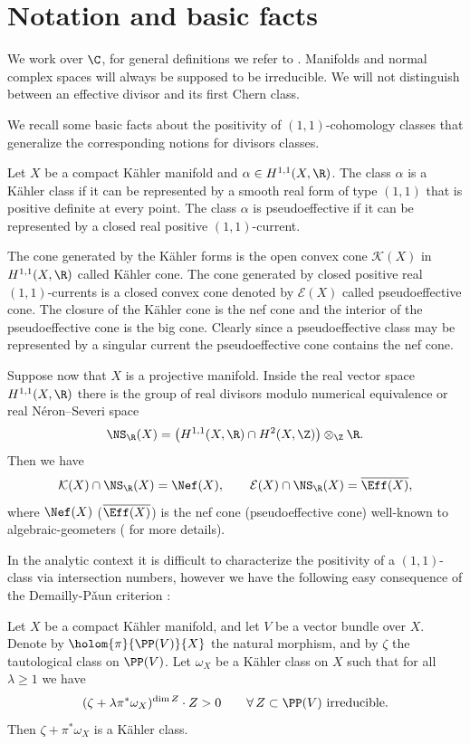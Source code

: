 \section{Notation and basic facts}

We work over $\C$, for general definitions we refer to \cite{Har77, Dem12}.
Manifolds and normal complex spaces will always be supposed to be irreducible.
We will not distinguish between an effective divisor and its first Chern class.

We recall some basic facts about the positivity of $(1,1)$-cohomology classes that generalize
the corresponding notions for divisors classes.

\begin{definition}
Let $X$ be a compact Kähler manifold and $\alpha\in H^{1,1}(X, \R)$. The class $\alpha$ is a Kähler class if it can be represented by a smooth real form of type $(1,1)$ that is positive definite at every point. The class $\alpha$ is pseudoeffective if it can be represented by a closed real positive $(1,1)$-current.
\end{definition}

The cone generated by the Kähler forms is the open convex cone $\mathcal{K}(X)$ in $H^{1,1}(X, \R)$ called Kähler cone. The cone generated by closed positive real $(1,1)$-currents is a closed convex cone denoted by $\mathcal{E}(X)$ called pseudoeffective cone. The closure of the Kähler cone is the nef cone and the interior of the pseudoeffective cone is the big cone. Clearly since a pseudoeffective class may be represented by a singular current the pseudoeffective cone contains the nef cone.

Suppose now that $X$ is a projective manifold. Inside the real vector space $H^{1,1}(X, \R)$ there is the group of real divisors modulo numerical equivalence or real Néron--Severi space
\[
\NS_\R(X)=\left( H^{1,1}(X, \R)\cap H^2(X,\Z) \right)\otimes_\Z \R.
\]
Then we have
\[
\mathcal{K}(X)\cap \NS_\R(X) = \Nef(X),
\qquad
\mathcal{E}(X)\cap \NS_\R(X) = \overline{\Eff(X)},
\]
where $\Nef(X)$ (\resp $\overline{\Eff(X)}$) is the nef cone (\resp pseudoeffective
cone) well-known to algebraic-geometers (\cf \cite{BDPP13} for more details).

In the analytic context it is difficult to characterize the positivity of a $(1,1)$-class via intersection numbers,
however we have the following easy consequence of the Demailly-P\v aun criterion \cite[Th.\,0.1]{DP04}:

\begin{lemma} \label{lemmaconnected}
Let $X$ be a compact Kähler manifold, and let $V$ be a vector bundle over $X$.
Denote by $\holom{\pi}{\PP(V)}{X}$ the natural morphism, and by
$\zeta$ the tautological class on $\PP(V)$. Let $\omega_X$ be a Kähler class on $X$ such that
for all $\lambda \geq 1$ we have
\[
(\zeta+ \lambda \pi^* \omega_X)^{\dim Z} \cdot Z >0 \qquad \forall\,Z \subset \PP(V) \ \mbox{irreducible}.
\]
Then $\zeta+ \pi^* \omega_X$ is a Kähler class.
\end{lemma}

